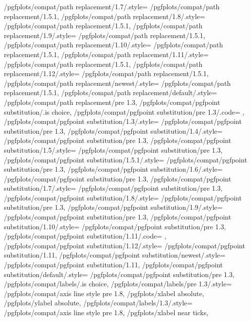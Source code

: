 {	/pgfplots/compat/path replacement/1.7/.style=   	{/pgfplots/compat/path replacement/1.5.1},
	/pgfplots/compat/path replacement/1.8/.style=   	{/pgfplots/compat/path replacement/1.5.1},
	/pgfplots/compat/path replacement/1.9/.style=   	{/pgfplots/compat/path replacement/1.5.1},
	/pgfplots/compat/path replacement/1.10/.style=   	{/pgfplots/compat/path replacement/1.5.1},
	/pgfplots/compat/path replacement/1.11/.style=   	{/pgfplots/compat/path replacement/1.5.1},
	/pgfplots/compat/path replacement/1.12/.style=   	{/pgfplots/compat/path replacement/1.5.1},
	/pgfplots/compat/path replacement/newest/.style= 	{/pgfplots/compat/path replacement/1.5.1},%
	/pgfplots/compat/path replacement/default/.style=	{/pgfplots/compat/path replacement/pre 1.3},%
	/pgfplots/compat/pgfpoint substitution/.is choice,
	/pgfplots/compat/pgfpoint substitution/pre 1.3/.code= {\pgfplots@substitute@pgfpointfalse},
	/pgfplots/compat/pgfpoint substitution/1.3/.style=    {/pgfplots/compat/pgfpoint substitution/pre 1.3},%
	/pgfplots/compat/pgfpoint substitution/1.4/.style=  	 {/pgfplots/compat/pgfpoint substitution/pre 1.3},
	/pgfplots/compat/pgfpoint substitution/1.5/.style=    {/pgfplots/compat/pgfpoint substitution/pre 1.3},%
	/pgfplots/compat/pgfpoint substitution/1.5.1/.style=	{/pgfplots/compat/pgfpoint substitution/pre 1.3},%
	/pgfplots/compat/pgfpoint substitution/1.6/.style=   	{/pgfplots/compat/pgfpoint substitution/pre 1.3},
	/pgfplots/compat/pgfpoint substitution/1.7/.style=   	{/pgfplots/compat/pgfpoint substitution/pre 1.3},
	/pgfplots/compat/pgfpoint substitution/1.8/.style=   	{/pgfplots/compat/pgfpoint substitution/pre 1.3},
	/pgfplots/compat/pgfpoint substitution/1.9/.style=   	{/pgfplots/compat/pgfpoint substitution/pre 1.3},
	/pgfplots/compat/pgfpoint substitution/1.10/.style=   	{/pgfplots/compat/pgfpoint substitution/pre 1.3},
	/pgfplots/compat/pgfpoint substitution/1.11/.code=   	{\pgfplots@substitute@pgfpointtrue},
	/pgfplots/compat/pgfpoint substitution/1.12/.style=   	{/pgfplots/compat/pgfpoint substitution/1.11},
	/pgfplots/compat/pgfpoint substitution/newest/.style= 	{/pgfplots/compat/pgfpoint substitution/1.11},%
	/pgfplots/compat/pgfpoint substitution/default/.style=	{/pgfplots/compat/pgfpoint substitution/pre 1.3},%
	/pgfplots/compat/labels/.is choice,
	/pgfplots/compat/labels/pre 1.3/.style={%
		/pgfplots/compat/axis line style pre 1.8,
		/pgfplots/xlabel absolute,
		/pgfplots/ylabel absolute},%
	/pgfplots/compat/labels/1.3/.style={%
		/pgfplots/compat/axis line style pre 1.8,
		/pgfplots/xlabel near ticks,
}}
